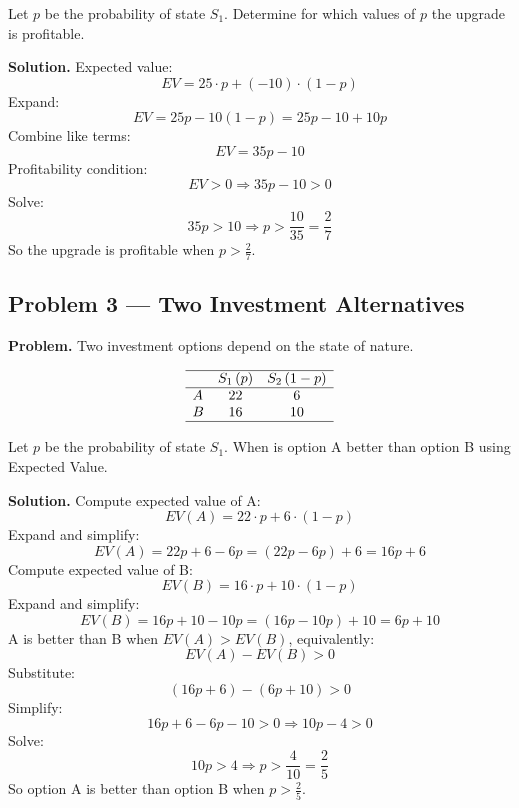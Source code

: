 \begin{ExamProblems}
		Let \(p\) be the probability of state \(S_1\).  
		Determine for which values of \(p\) the upgrade is profitable.
		
		\textbf{Solution.}
		Expected value:
		\[
		EV = 25\cdot p + (-10)\cdot(1-p)
		\]
		Expand:
		\[
		EV = 25p - 10(1-p) = 25p - 10 + 10p
		\]
		Combine like terms:
		\[
		EV = 35p - 10
		\]
		Profitability condition:
		\[
		EV>0 \Rightarrow 35p-10>0
		\]
		Solve:
		\[
		35p>10 \Rightarrow p>\frac{10}{35}=\frac{2}{7}
		\]
		So the upgrade is profitable when \(p>\frac{2}{7}\).
		
		
		\hypertarget{c7-ex3}{}
		\item\leavevmode\par
		\subsection*{Problem 3 — Two Investment Alternatives}
		
		\textbf{Problem.}
		Two investment options depend on the state of nature.
		
		\[
		\begin{array}{lcc}
			\hline
			& S_1\,(p) & S_2\,(1-p) \\
			\hline
			A & 22 & 6 \\
			B & 16 & 10 \\
			\hline
		\end{array}
		\]
		
		Let \(p\) be the probability of state \(S_1\).  
		When is option A better than option B using Expected Value.
		
		\textbf{Solution.}
		Compute expected value of A:
		\[
		EV(A)=22\cdot p + 6\cdot(1-p)
		\]
		Expand and simplify:
		\[
		EV(A)=22p + 6 - 6p = (22p-6p)+6 = 16p+6
		\]
		Compute expected value of B:
		\[
		EV(B)=16\cdot p + 10\cdot(1-p)
		\]
		Expand and simplify:
		\[
		EV(B)=16p + 10 - 10p = (16p-10p)+10 = 6p+10
		\]
		A is better than B when \(EV(A)>EV(B)\), equivalently:
		\[
		EV(A)-EV(B)>0
		\]
		Substitute:
		\[
		(16p+6)-(6p+10)>0
		\]
		Simplify:
		\[
		16p+6-6p-10>0 \Rightarrow 10p-4>0
		\]
		Solve:
		\[
		10p>4 \Rightarrow p>\frac{4}{10}=\frac{2}{5}
		\]
		So option A is better than option B when \(p>\frac{2}{5}\).
		
		
		\hypertarget{c7-ex4}{}
		\item\leavevmode\par

\end{ExamProblems}
